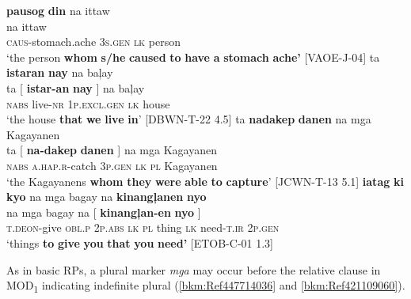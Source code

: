 \ea
\textbf{pausog}  \textbf{din}    na  ittaw \\\smallskip
   na  ittaw \\
{} \textsc{caus}-stomach.ache  3\textsc{s.gen} {}  \textsc{lk}  person \\
\glt ‘the person \textbf{whom} \textbf{s/he} \textbf{caused} \textbf{to} \textbf{have} \textbf{a} \textbf{stomach} \textbf{ache’} [VAOE-J-04]
\z
\ea
ta \textbf{istaran}  \textbf{nay}  na  baļay \\\smallskip
 \gll ta       [ \textbf{istar-an}  \textbf{nay}           ]  na  baļay \\
\textsc{nabs} {} live-\textsc{nr}  1\textsc{p.excl.gen} {}  \textsc{lk}  house \\
\glt ‘the house \textbf{that} \textbf{we} \textbf{live} \textbf{in}’ [DBWN-T-22 4.5]
\z
\ea
ta  \textbf{nadakep}  \textbf{danen} na  mga  Kagayanen \\\smallskip
 \gll ta  [ \textbf{na-dakep}  \textbf{danen} ]  na  mga  Kagayanen \\
\textsc{nabs} {} \textsc{a.hap.r}\textsc{-}catch  3\textsc{p.gen} {} \textsc{lk}  \textsc{pl}  Kagayanen \\
\glt ‘the Kagayanens \textbf{whom} \textbf{they} \textbf{were} \textbf{able} \textbf{to} \textbf{capture}’ [JCWN-T-13 5.1]
\z
\ea
\label{bkm:Ref360181429}
\textbf{iatag}  \textbf{ki}  \textbf{kyo}   na  mga  bagay  na \textbf{kinangļanen}  \textbf{nyo} \\\smallskip
   na  mga  bagay  na  [ \textbf{kinangļan-en}  \textbf{nyo}{ }] \\
{} \textsc{t.deon}-give  \textsc{obl.p}  2\textsc{p.abs}  {} \textsc{lk}  \textsc{pl}  thing  \textsc{lk}     {} need-\textsc{t.ir}  2\textsc{p.gen} {} \\
\glt ‘things \textbf{to} \textbf{give} \textbf{you} \textbf{that} \textbf{you} \textbf{need’} [ETOB-C-01 1.3]
\z

\largerpage
As in basic RPs, a plural marker \textit{mga} may occur before the relative clause in MOD\textsubscript{1} indicating indefinite plural (\ref{bkm:Ref447714036} and \ref{bkm:Ref421109060}).


